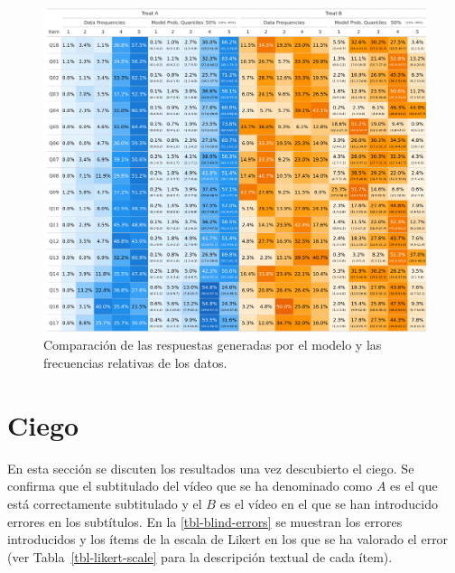 \documentclass[
  12pt,
  a4paper,
  extrafontsizes,
  onecolumn,
  openright,
  table]{memoir}
\begin{document}
\begin{figure}[h]
\begin{adjustwidth}{-3.4cm}{}

\includegraphics[width=1.2\linewidth]{images/bayes-probs.png} \hfill{}

\caption{\label{fig-prob-compare}Comparación de las respuestas generadas
por el modelo y las frecuencias relativas de los datos.}

\end{adjustwidth}
\end{figure}


\hypertarget{ciego}{%
\chapter{Ciego}\label{ciego}}

En esta sección se discuten los resultados una vez descubierto el ciego.
Se confirma que el subtitulado del vídeo que se ha denominado como \(A\)
es el que está correctamente subtitulado y el \(B\) es el vídeo en el
que se han introducido errores en los subtítulos. En la
\ref{tbl-blind-errors} se muestran los errores introducidos y los ítems
de la escala de Likert en los que se ha valorado el error (ver
Tabla~\ref{tbl-likert-scale} para la descripción textual de cada ítem).
\end{document}
